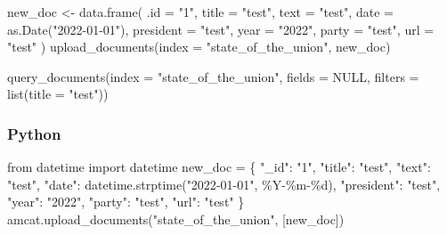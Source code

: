 \documentclass[
  letterpaper,
  DIV=11,
  numbers=noendperiod]{scrreprt}
\newenvironment{Shaded}{\begin{snugshade}}{\end{snugshade}}
\newcommand{\AttributeTok}[1]{\textcolor[rgb]{0.40,0.45,0.13}{#1}}
\newcommand{\ConstantTok}[1]{\textcolor[rgb]{0.56,0.35,0.01}{#1}}
\newcommand{\FunctionTok}[1]{\textcolor[rgb]{0.28,0.35,0.67}{#1}}
\newcommand{\ImportTok}[1]{\textcolor[rgb]{0.00,0.46,0.62}{#1}}
\newcommand{\NormalTok}[1]{\textcolor[rgb]{0.00,0.23,0.31}{#1}}
\newcommand{\OperatorTok}[1]{\textcolor[rgb]{0.37,0.37,0.37}{#1}}
\newcommand{\OtherTok}[1]{\textcolor[rgb]{0.00,0.23,0.31}{#1}}
\newcommand{\SpecialCharTok}[1]{\textcolor[rgb]{0.37,0.37,0.37}{#1}}
\newcommand{\StringTok}[1]{\textcolor[rgb]{0.13,0.47,0.30}{#1}}
\begin{document}
\begin{Shaded}
\begin{Highlighting}[]
\NormalTok{new\_doc }\OtherTok{\textless{}{-}} \FunctionTok{data.frame}\NormalTok{(}
  \AttributeTok{.id =} \StringTok{"1"}\NormalTok{,}
  \AttributeTok{title =} \StringTok{"test"}\NormalTok{,}
  \AttributeTok{text =} \StringTok{"test"}\NormalTok{,}
  \AttributeTok{date =} \FunctionTok{as.Date}\NormalTok{(}\StringTok{"2022{-}01{-}01"}\NormalTok{),}
  \AttributeTok{president =} \StringTok{"test"}\NormalTok{,}
  \AttributeTok{year =} \StringTok{"2022"}\NormalTok{,}
  \AttributeTok{party =} \StringTok{"test"}\NormalTok{,}
  \AttributeTok{url =} \StringTok{"test"}
\NormalTok{)}
\FunctionTok{upload\_documents}\NormalTok{(}\AttributeTok{index =} \StringTok{"state\_of\_the\_union"}\NormalTok{, new\_doc)}
\end{Highlighting}
\end{Shaded}

\begin{Shaded}
\begin{Highlighting}[]
\FunctionTok{query\_documents}\NormalTok{(}\AttributeTok{index =} \StringTok{"state\_of\_the\_union"}\NormalTok{, }\AttributeTok{fields =} \ConstantTok{NULL}\NormalTok{, }\AttributeTok{filters =} \FunctionTok{list}\NormalTok{(}\AttributeTok{title =} \StringTok{"test"}\NormalTok{))}
\end{Highlighting}
\end{Shaded}

\subsubsection{Python}

\begin{Shaded}
\begin{Highlighting}[]
\ImportTok{from}\NormalTok{ datetime }\ImportTok{import}\NormalTok{ datetime}
\NormalTok{new\_doc }\OperatorTok{=}\NormalTok{ \{}
  \StringTok{"\_id"}\NormalTok{: }\StringTok{"1"}\NormalTok{,}
  \StringTok{"title"}\NormalTok{: }\StringTok{"test"}\NormalTok{,}
  \StringTok{"text"}\NormalTok{: }\StringTok{"test"}\NormalTok{,}
  \StringTok{"date"}\NormalTok{: datetime.strptime(}\StringTok{"2022{-}01{-}01"}\NormalTok{, }\StringTok{\textquotesingle{}\%Y{-}\%m{-}}\SpecialCharTok{\%d}\StringTok{\textquotesingle{}}\NormalTok{),}
  \StringTok{"president"}\NormalTok{: }\StringTok{"test"}\NormalTok{,}
  \StringTok{"year"}\NormalTok{: }\StringTok{"2022"}\NormalTok{,}
  \StringTok{"party"}\NormalTok{: }\StringTok{"test"}\NormalTok{,}
  \StringTok{"url"}\NormalTok{: }\StringTok{"test"}
\NormalTok{\}}
\NormalTok{amcat.upload\_documents(}\StringTok{"state\_of\_the\_union"}\NormalTok{, [new\_doc])}
\end{Highlighting}
\end{Shaded}
\end{document}
